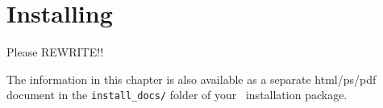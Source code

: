 \chapter{Installing \MCS}
\label{installing}

Please REWRITE!!

The information in this chapter is also available as a separate
html/ps/pdf document in the \texttt{install\_docs/} folder of your
\MCS\ installation package.

